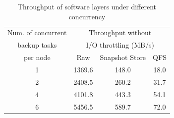 \begin{table}[htbp]
    \centering
    \begin{tabular}{c|ccc}
    Num. of concurrent      & \multicolumn{3}{c}{Throughput without}    \\
    backup tasks            & \multicolumn{3}{c}{I/O throttling (MB/s)} \\ \cline{2-4}
    per node                & Raw                                        & Snapshot Store & QFS  \\ \hline
    1                       & 1369.6                                     & 148.0          & 18.0 \\
    2                       & 2408.5                                     & 260.2          & 31.7 \\
    4                       & 4101.8                                     & 443.3          & 54.1 \\
    6                       & 5456.5                                     & 589.7          & 72.0 \\
    \end{tabular}
\caption{Throughput of software layers under different concurrency}
\label{tab:throughput}
\end{table}

